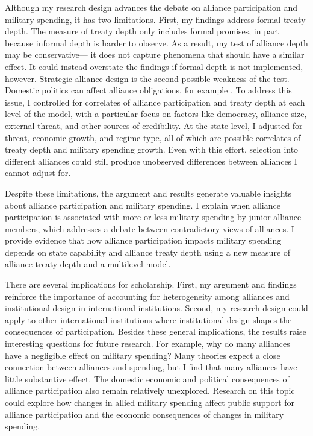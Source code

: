 \documentclass[12pt]{article}
\begin{document}
Although my research design advances the debate on alliance participation and military spending, it has two limitations. 
First, my findings address formal treaty depth. 
The measure of treaty depth only includes formal promises, in part because informal depth is harder to observe. 
As a result, my test of alliance depth may be conservative--- it does not capture phenomena that should have a similar effect. 
It could instead overstate the findings if formal depth is not implemented, however. 
Strategic alliance design is the second possible weakness of the test. 
Domestic politics can affect alliance obligations, for example \citep{Davis2004, Chibaetal2015}.   
To address this issue, I controlled for correlates of alliance participation and treaty depth at each level of the model, with a particular focus on factors like democracy, alliance size, external threat, and other sources of credibility.
At the state level, I adjusted for threat, economic growth, and regime type, all of which are possible correlates of treaty depth and military spending growth. 
Even with this effort, selection into different alliances could still produce unobserved differences between alliances I cannot adjust for. 


Despite these limitations, the argument and results generate valuable insights about alliance participation and military spending. 
I explain when alliance participation is associated with more or less military spending by junior alliance members, which addresses a debate between contradictory views of alliances.  
I provide evidence that how alliance participation impacts military spending depends on state capability and alliance treaty depth using a new measure of alliance treaty depth and a multilevel model. 


There are several implications for scholarship. 
First, my argument and findings reinforce the importance of accounting for heterogeneity among alliances and institutional design in international institutions.
Second, my research design could apply to other international institutions where institutional design shapes the consequences of participation.
Besides these general implications, the results raise interesting questions for future research. 
For example, why do many alliances have a negligible effect on military spending? 
Many theories expect a close connection between alliances and spending, but I find that many alliances have little substantive effect.
The domestic economic and political consequences of alliance participation also remain relatively unexplored.
Research on this topic could explore how changes in allied military spending affect public support for alliance participation and the economic consequences of changes in military spending.  
\end{document}

